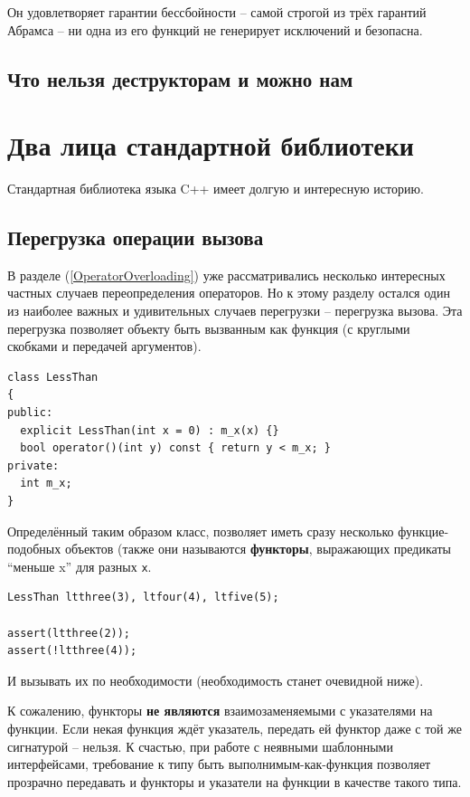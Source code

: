 \documentclass[a4paper,12pt,oneside]{article}
\begin{document}
Он удовлетворяет гарантии бессбойности -- самой строгой из трёх гарантий Абрамса -- ни одна из его функций не генерирует исключений и безопасна.

\subsection{Что нельзя деструкторам и можно нам}

\pagebreak
\section{Два лица стандартной библиотеки}

Стандартная библиотека языка C++ имеет долгую и интересную историю.

\subsection{Перегрузка операции вызова}

В разделе (\ref{OperatorOverloading}) уже рассматривались несколько интересных частных случаев переопределения операторов. Но к этому разделу остался один из наиболее важных и удивительных случаев перегрузки -- перегрузка вызова. Эта перегрузка позволяет объекту быть вызванным как функция (с круглыми скобками и передачей аргументов).

\begin{lstlisting}
class LessThan
{
public:
  explicit LessThan(int x = 0) : m_x(x) {}
  bool operator()(int y) const { return y < m_x; }
private:
  int m_x;
}
\end{lstlisting}

Определённый таким образом класс, позволяет иметь сразу несколько функцие-подобных объектов (также они называются \textbf{функторы}, выражающих предикаты ``меньше x'' для разных \lstinline!x!.

\begin{lstlisting}
LessThan ltthree(3), ltfour(4), ltfive(5);

assert(ltthree(2));
assert(!ltthree(4));
\end{lstlisting}

И вызывать их по необходимости (необходимость станет очевидной ниже).

К сожалению, функторы \textbf{не являются} взаимозаменяемыми с указателями на функции. Если некая функция ждёт указатель, передать ей функтор даже с той же сигнатурой -- нельзя. К счастью, при работе с неявными шаблонными интерфейсами, требование к типу быть выполнимым-как-функция позволяет прозрачно передавать и функторы и указатели на функции в качестве такого типа.
 
\end{document}
